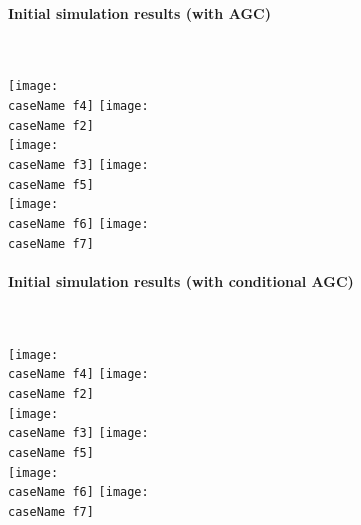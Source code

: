 \documentclass[12pt]{article}
\begin{document}
\pagebreak
\paragraph{Initial simulation results (with AGC)} \ \\

\begin{center}
\newcommand{\caseName}{AGC}
\texttt{[image: \\caseName f4]} %
\texttt{[image: \\caseName f2]} \\%
\texttt{[image: \\caseName f3]} %
\texttt{[image: \\caseName f5]} \\%
\texttt{[image: \\caseName f6]} %
\texttt{[image: \\caseName f7]} \\%
\end{center}

\pagebreak
\paragraph{Initial simulation results (with conditional AGC)} \ \\


\begin{center}
\newcommand{\caseName}{AGCcond}
\texttt{[image: \\caseName f4]} %
\texttt{[image: \\caseName f2]} \\%
\texttt{[image: \\caseName f3]} %
\texttt{[image: \\caseName f5]} \\%
\texttt{[image: \\caseName f6]} %
\texttt{[image: \\caseName f7]} \\%
\end{center}

\end{document}
